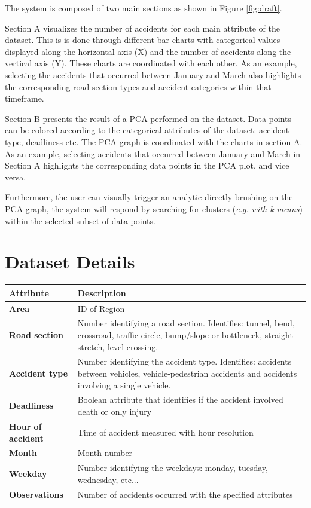 \documentclass[12pt]{article}
\begin{document}
The system is composed of two main sections as shown in Figure \ref{fig:draft}.

Section A visualizes the number of accidents for each main attribute
of the dataset. This is is done through different bar charts with categorical values displayed along the horizontal axis (X) and the number of accidents along the vertical axis (Y).
These charts are coordinated with each other.
As an example, selecting the accidents that occurred between January and March
also highlights the corresponding road section types and accident categories within that timeframe.


Section B presents the result of a PCA performed on the dataset.
Data points can be colored according to the categorical attributes of the dataset:
accident type, deadliness etc.
The PCA graph is coordinated with the charts in section A.
As an example, selecting accidents that occurred between January and March in Section A highlights the corresponding data points in the PCA plot, and vice versa.

Furthermore, the user can visually trigger an analytic directly brushing on the PCA graph, the system will respond by searching for clusters (\textit{e.g. with k-means}) within the selected subset of data points.



\section{Dataset Details}

\begin{tabularx}{\textwidth} {| >{\bfseries}l | X |} 

\hline
Attribute & \textbf{Description} \\
\hline\hline

Area & ID of Region \\
\hline
Road section & Number identifying a road section. Identifies: tunnel, bend, crossroad, traffic circle, bump/slope or bottleneck, straight stretch, level crossing. \\
\hline
Accident type &  Number identifying the accident type. Identifies:
accidents between vehicles, vehicle-pedestrian accidents and accidents involving
a single vehicle. \\ 
\hline
Deadliness &  Boolean attribute that identifies if the accident involved death or only injury \\
\hline
Hour of accident &  Time of accident measured with hour resolution \\
\hline
Month &  Month number \\
\hline
Weekday & Number identifying the weekdays: monday, tuesday, wednesday, etc...\\
\hline
Observations &  Number of accidents occurred with the specified attributes \\
\hline
\end{tabularx}
\end{document}
